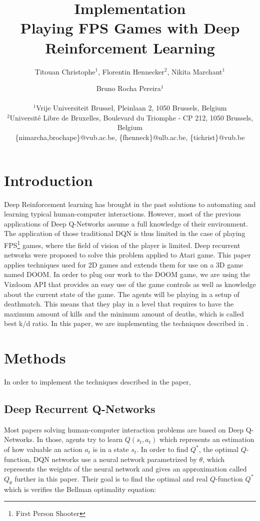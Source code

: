 \documentclass[letterpaper]{article}
\title{Implementation\\Playing FPS Games with Deep Reinforcement Learning}
\author{Titouan Christophe$^{1}$, Florentin Hennecker$^{2}$, Nikita Marchant$^{1}$ \and Bruno Rocha Pereira$^{1}$ \\
\mbox{}\\
$^1$Vrije Universiteit Brussel, Pleinlaan 2, 1050 Brussels, Belgium \\
$^2$Universit\'e Libre de Bruxelles, Boulevard du Triomphe - CP 212, 1050
Brussels, Belgium \\
\{nimarcha,brochape\}@vub.ac.be, \{fhenneck\}@ulb.ac.be, \{tichrist\}@vub.be}
\begin{document}
\maketitle

\begin{abstract}
\end{abstract}

\section{Introduction}
Deep Reinforcement learning has brought in the past solutions to automating and learning typical human-computer interactions. 
However, most of the previous applications of Deep Q-Networks assume a full knowledge of their environment. The application of those traditional DQN is thus limited in the case of playing FPS\footnote{First Person Shooter} games, where the field of vision of the player is limited. Deep recurrent networks were proposed to solve this problem \citep{Hausknecht2015} applied to Atari game. This paper applies techniques used for 2D games and extends them for use on a 3D game named DOOM.
In order to plug our work to the DOOM game, we are using the Vizdoom API \citep{Kempka2016} that provides an easy use of the game controls as well as knowledge about the current state of the game.
The agents will be playing in a setup of deathmatch. This means that they play in a level that requires to have the maximum amount of kills and the minimum amount of deaths, which is called best k/d ratio.
In this paper, we are implementing the techniques described in \citep{Lample2016}.
\section{Methods}
In order to implement the techniques described in the paper,

\subsection{Deep Recurrent Q-Networks}
Most papers solving human-computer interaction problems are based on Deep Q-Networks. In those, agents try to learn $Q(s_t,a_t)$ which represents an estimation of how valuable an action $a_t$ is in a state $s_t$. In order to find $Q^*$, the optimal $Q$-function, DQN networks use a neural network parametrized by $\theta$, which represents the weights of the neural network and gives an approximation called $Q_\theta$ further in this paper. Their goal is to find the optimal and real $Q$-function $Q^*$ which is verifies the Bellman optimality equation:
\end{document}
